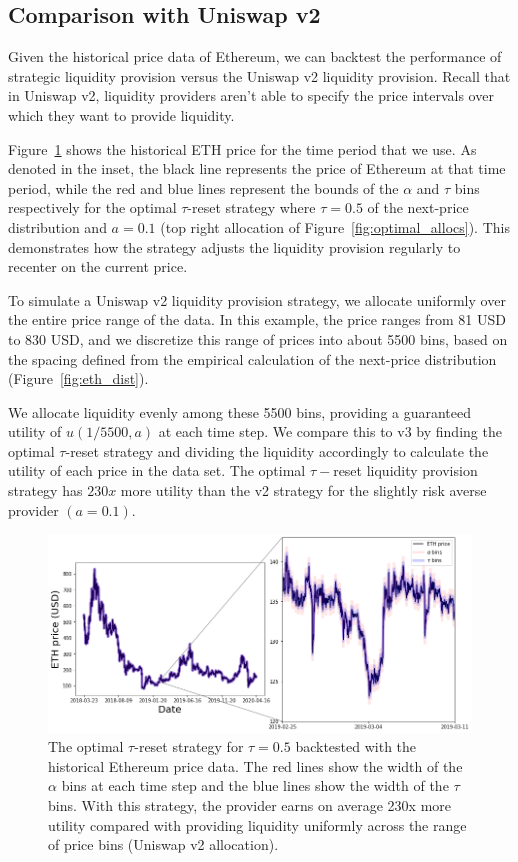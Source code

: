 \documentclass[sigconf, usenames, dvipsnames]{acmart}
\begin{document}
\subsection{Comparison with Uniswap v2}

Given the historical price data of Ethereum, we can backtest the performance of strategic liquidity provision versus the Uniswap v2 liquidity provision. Recall that in Uniswap v2, liquidity providers aren't able to specify the price intervals over which they want to provide liquidity. 

Figure~\ref{fig:eth_price} shows the historical ETH price for the time period that we use. As denoted in the inset, the black line represents the price of Ethereum at that time period, while the red and blue lines represent the bounds of the $\alpha$ and $\tau$ bins respectively for the optimal $\tau$-reset strategy where $\tau=0.5$ of the next-price distribution and $a=0.1$ (top right allocation of Figure~\ref{fig:optimal_allocs}). This demonstrates how the strategy adjusts the liquidity provision regularly to recenter on the current price. 

To simulate a Uniswap v2 liquidity provision strategy, we  allocate uniformly over the entire price range of the data. In this example, the price ranges from 81 USD to 830 USD, and we discretize this range of prices into about 5500 bins, based on the spacing defined from the empirical calculation of the next-price distribution (Figure~\ref{fig:eth_dist}). 

We allocate liquidity evenly among these 5500 bins, providing a  guaranteed utility of $u(1/5500, a)$ at each time step. We compare this to v3 by finding the optimal $\tau$-reset strategy and dividing the liquidity accordingly to calculate the utility of each price in the data set. The optimal $\tau-$reset liquidity provision strategy has $230x$ more utility than the v2 strategy for the slightly risk averse provider $(a=0.1)$.


\begin{figure}
    \centering
    \includegraphics[width=0.7\linewidth]{img/eth_price.png}
    \caption{The optimal $\tau$-reset strategy for $\tau=0.5$ backtested with the historical Ethereum price data. The red lines show the width of the $\alpha$ bins at each time step and the blue lines show the width of the $\tau$ bins. With this strategy, the provider earns on average 230x more utility compared with providing liquidity uniformly across the range of price bins (Uniswap v2 allocation).
    \label{fig:eth_price}}
\end{figure}
\end{document}

